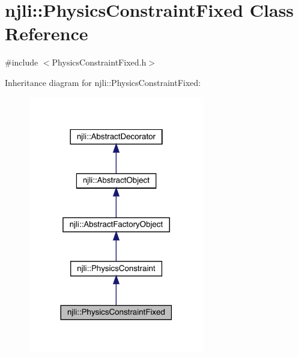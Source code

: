 \hypertarget{classnjli_1_1_physics_constraint_fixed}{}\section{njli\+:\+:Physics\+Constraint\+Fixed Class Reference}
\label{classnjli_1_1_physics_constraint_fixed}


{\ttfamily \#include $<$Physics\+Constraint\+Fixed.\+h$>$}



Inheritance diagram for njli\+:\+:Physics\+Constraint\+Fixed\+:\nopagebreak
\begin{figure}[H]
\begin{center}
\leavevmode
\includegraphics[width=218pt]{classnjli_1_1_physics_constraint_fixed__inherit__graph}
\end{center}
\end{figure}


